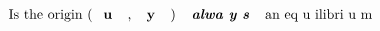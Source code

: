 \documentclass[preview]{standalone}
\begin{document}
\begin{align*}
\text { Is   the   origin   (\textbf {   { u }   } ,   \textbf {   { y }   } )   \textbf { \emph { alwa y s } }   an   eq u ilibri u m }
\end{align*}
\end{document}
